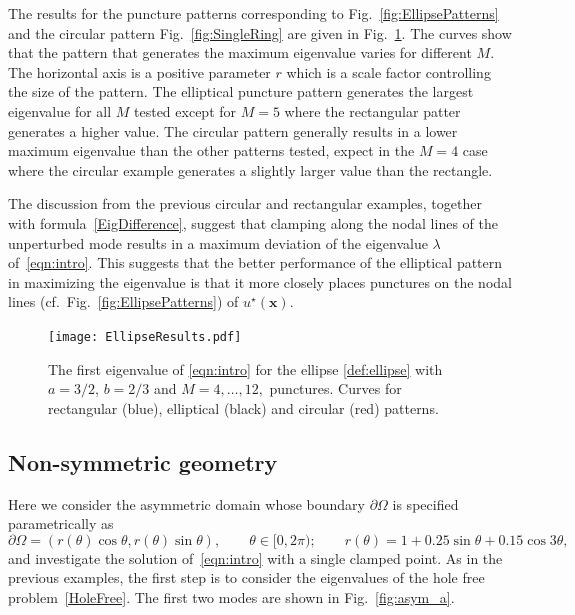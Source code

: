 \documentclass[times]{article}
\newcommand{\xx}{\mathbf{x}}
\begin{document}
The results for the puncture patterns corresponding to
Fig.~\ref{fig:EllipsePatterns} and the circular pattern
Fig.~\ref{fig:SingleRing} are given in Fig.~\ref{fig:EllipseResults}.
The curves show that the pattern that generates the maximum eigenvalue
varies for different $M$. The horizontal axis is a positive parameter
$r$ which is a scale factor controlling the size of the pattern. The
elliptical puncture pattern generates the largest eigenvalue for all $M$
tested except for $M=5$ where the rectangular patter generates a higher
value. The circular pattern generally results in a lower maximum
eigenvalue than the other patterns tested, expect in the $M=4$ case
where the circular example generates a slightly larger value than the
rectangle.
%

The discussion from the previous circular and rectangular examples,
together with formula~\eqref{EigDifference}, suggest that clamping
along the nodal lines of the unperturbed mode results in a maximum
deviation of the eigenvalue $\lambda$ of~\eqref{eqn:intro}. This
suggests that the better performance of the elliptical pattern in
maximizing the eigenvalue is that it more closely places punctures on
the nodal lines (cf.~Fig.~\ref{fig:EllipsePatterns}) of
$u^{\star}(\xx)$.

\begin{figure}[htbp]
\centering
\texttt{[image: EllipseResults.pdf]}\
\parbox{0.75\textwidth}{\caption{The first eigenvalue of \eqref{eqn:intro} for the ellipse \eqref{def:ellipse} with $a= 3/2$, $b = 2/3$ and $M=4,\ldots,12,$ punctures. Curves for rectangular (blue), elliptical (black) and circular (red) patterns. \label{fig:EllipseResults} }}
\end{figure}
%

\subsection{Non-symmetric geometry}\label{sec:nonsymmetric}

Here we consider the asymmetric domain whose boundary $\partial\Omega$
is specified parametrically as
\begin{equation*}
  \partial\Omega = (r(\theta)\cos\theta,r(\theta)\sin\theta), \qquad 
  \theta\in[0,2\pi); \qquad 
  r(\theta) = 1 + 0.25\sin \theta + 0.15\cos 3\theta,
\end{equation*}
and investigate the solution of~\eqref{eqn:intro} with a single clamped
point. As in the previous examples, the first step is to consider the
eigenvalues of the hole free problem~\eqref{HoleFree}. The first two
modes are shown in Fig.~\ref{fig:asym_a}.
\end{document}
